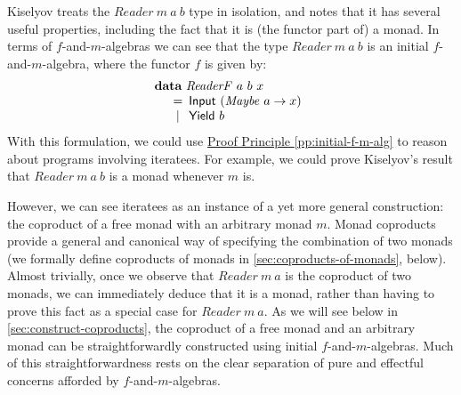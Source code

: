 \documentclass{jfp1}
\newcommand{\proofprinref}[1]{\hyperref[#1]{Proof Principle \ref*{#1}}}
\newcommand{\kw}[1]{\textbf{#1}}
\begin{document}
Kiselyov treats the $\mathit{Reader}~m~a~b$ type in isolation, and
notes that it has several useful properties, including the fact that
it is (the functor part of) a monad. In terms of $f$-and-$m$-algebras
we can see that the type $\mathit{Reader}~m~a~b$ is an initial
$f$-and-$m$-algebra, where the functor $f$ is given by:
\begin{displaymath}
  \begin{array}{l}
    \kw{data}~\mathit{ReaderF}~a~b~x \\
    \quad\begin{array}[t]{c@{\hspace{0.5em}}l}
      = & \mathsf{Input}~(\mathit{Maybe}~a \to x) \\
      | & \mathsf{Yield}~b
    \end{array}
  \end{array}
\end{displaymath}
With this formulation, we could use \proofprinref{pp:initial-f-m-alg}
to reason about programs involving iteratees. For example, we could
prove Kiselyov's result that $\mathit{Reader}~m~a~b$ is a monad
whenever $m$ is.

However, we can see iteratees as an instance of a yet more general
construction: the coproduct of a free monad with an arbitrary monad
$m$. Monad coproducts provide a general and canonical way of
specifying the combination of two monads \cite{luth02composing} (we
formally define coproducts of monads in
\autoref{sec:coproducts-of-monads}, below). Almost trivially, once we
observe that $\mathit{Reader}~m~a$ is the coproduct of two monads, we
can immediately deduce that it is a monad, rather than having to prove
this fact as a special case for $\mathit{Reader}~m~a$. As we will see
below in \autoref{sec:construct-coproducts}, the coproduct of a free
monad and an arbitrary monad can be straightforwardly constructed
using initial $f$-and-$m$-algebras. Much of this straightforwardness
rests on the clear separation of pure and effectful concerns afforded
by $f$-and-$m$-algebras.
\end{document}
